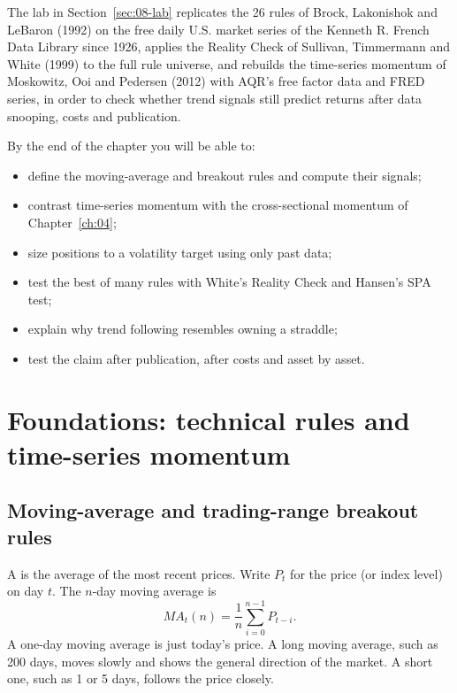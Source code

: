 The lab in Section~\ref{sec:08-lab} replicates the 26 rules of Brock, Lakonishok and LeBaron (1992) on the free daily U.S. market series of the Kenneth R. French Data Library since 1926, applies the Reality Check of Sullivan, Timmermann and White (1999) to the full rule universe, and rebuilds the time-series momentum of Moskowitz, Ooi and Pedersen (2012) with AQR's free factor data and FRED series, in order to check whether trend signals still predict returns after data snooping, costs and publication.

By the end of the chapter you will be able to:

\begin{itemize}
  \item define the moving-average and breakout rules and compute their signals;
  \item contrast time-series momentum with the cross-sectional momentum of Chapter~\ref{ch:04};
  \item size positions to a volatility target using only past data;
  \item test the best of many rules with White's Reality Check and Hansen's SPA test;
  \item explain why trend following resembles owning a straddle;
  \item test the claim after publication, after costs and asset by asset.
\end{itemize}


\section{Foundations: technical rules and time-series momentum}
\label{sec:08-foundations}

\subsection{Moving-average and trading-range breakout rules}

A  is the average of the most recent prices. Write $P_t$ for the price (or index level) on day $t$. The $n$-day moving average is
\begin{equation}
  MA_t(n) = \frac{1}{n} \sum_{i=0}^{n-1} P_{t-i}.
  \label{eq:08-ma}
\end{equation}
A one-day moving average is just today's price. A long moving average, such as 200 days, moves slowly and shows the general direction of the market. A short one, such as 1 or 5 days, follows the price closely.

